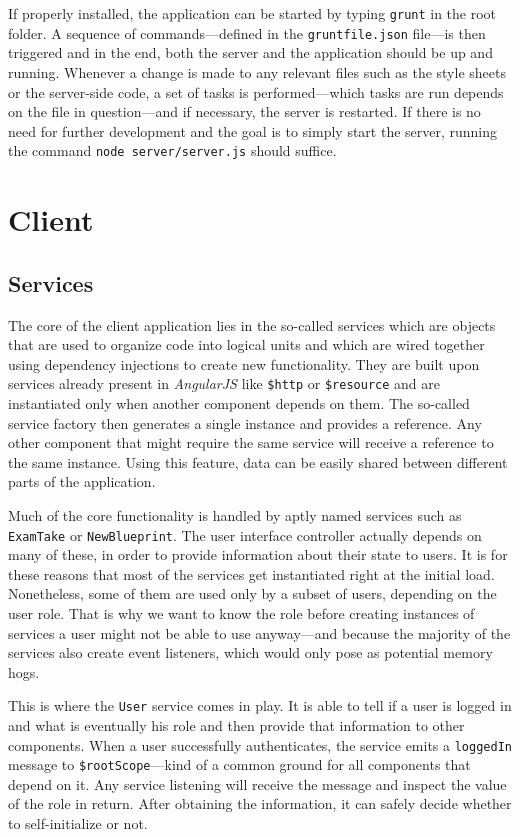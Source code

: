 \documentclass[thesis=M,english,hidelinks]{FITthesis}[2012/10/20]
\newcommand{\code}{\texttt}
\begin{document}
If properly installed, the application can be started by typing \code{grunt} in the root folder. A sequence of commands---defined in the \code{gruntfile.json} file---is then triggered and in the end, both the server and the application should be up and running. Whenever a change is made to any relevant files such as the style sheets or the server-side code, a set of tasks is performed---which tasks are run depends on the file in question---and if necessary, the server is restarted. If there is no need for further development and the goal is to simply start the server, running the command \code{node server/server.js} should suffice.

\section{Client}

  \subsection{Services}

The core of the client application lies in the so-called services which are objects that are used to organize code into logical units and which are wired together using dependency injections to create new functionality. They are built upon services already present in \textit{AngularJS} like \code{\$http} or \code{\$resource}  and are instantiated only when another component depends on them. The so-called service factory then generates a single instance and provides a reference. Any other component that might require the same service will receive a reference to the same instance. Using this feature, data can be easily shared between different parts of the application.

Much of the core functionality is handled by aptly named services such as \code{ExamTake} or \code{NewBlueprint}. The user interface controller actually depends on many of these, in order to provide information about their state to users. It is for these reasons that most of the services get instantiated right at the initial load. Nonetheless, some of them are used only by a subset of users, depending on the user role. That is why we want to know the role before creating instances of services a user might not be able to use anyway---and because the majority of the services also create event listeners, which would only pose as potential memory hogs.

This is where the \code{User} service comes in play. It is able to tell if a user is logged in and what is eventually his role and then provide that information to other components. When a user successfully authenticates, the service emits a \code{loggedIn} message to \code{\$rootScope}---kind of a common ground for all components that depend on it. Any service listening will receive the message and inspect the value of the role in return. After obtaining the information, it can safely decide whether to self-initialize or not.
\end{document}

